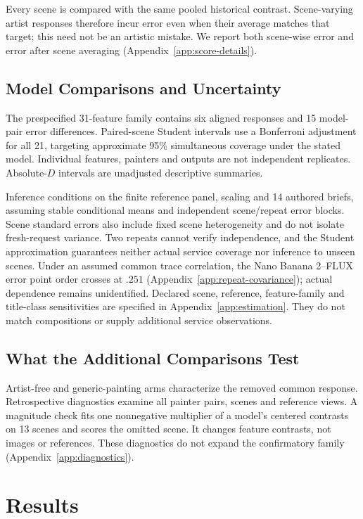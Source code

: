 Every scene is compared with the same pooled historical contrast. Scene-varying
artist responses therefore incur error even when their average matches that
target; this need not be an artistic mistake. We report both scene-wise error
and error after scene averaging (Appendix~\ref{app:score-details}).

\subsection{Model Comparisons and Uncertainty}
The prespecified 31-feature family contains six aligned responses and 15
model-pair error differences. Paired-scene Student intervals use a Bonferroni
adjustment for all 21, targeting approximate 95\% simultaneous coverage under
the stated model. Individual features, painters and outputs are not independent
replicates. Absolute-$D$ intervals are unadjusted descriptive summaries.

Inference conditions on the finite reference panel, scaling and 14 authored
briefs, assuming stable conditional means and independent scene/repeat error
blocks. Scene standard errors also include fixed scene heterogeneity and do
not isolate fresh-request variance. Two repeats cannot verify independence,
and the Student approximation guarantees neither actual service coverage nor
inference to unseen scenes. Under an assumed common trace correlation, the
Nano Banana 2--FLUX error point order crosses at $.251$
(Appendix~\ref{app:repeat-covariance}); actual dependence remains unidentified.
Declared scene, reference, feature-family and title-class sensitivities are
specified in Appendix~\ref{app:estimation}. They do not match compositions or
supply additional service observations.

\subsection{What the Additional Comparisons Test}\label{sec:diagnostics}
Artist-free and generic-painting arms characterize the removed common response.
Retrospective diagnostics examine all painter pairs, scenes and reference views.
A magnitude check fits one nonnegative multiplier of a model's centered
contrasts on 13 scenes and scores the omitted scene. It changes feature
contrasts, not images or references. These diagnostics do not expand the
confirmatory family (Appendix~\ref{app:diagnostics}).

\section{Results}\label{sec:results}
